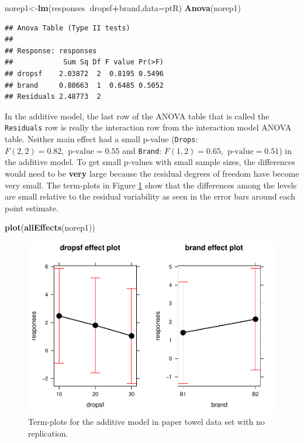 \documentclass[]{book}
\newenvironment{Shaded}{\begin{snugshade}}{\end{snugshade}}
\newcommand{\KeywordTok}[1]{\textcolor[rgb]{0.13,0.29,0.53}{\textbf{#1}}}
\newcommand{\DataTypeTok}[1]{\textcolor[rgb]{0.13,0.29,0.53}{#1}}
\newcommand{\OperatorTok}[1]{\textcolor[rgb]{0.81,0.36,0.00}{\textbf{#1}}}
\newcommand{\NormalTok}[1]{#1}
\theoremstyle{definition}
\theoremstyle{definition}
\theoremstyle{remark}
\begin{document}
\begin{Shaded}
\begin{Highlighting}[]
\NormalTok{norep1<-}\KeywordTok{lm}\NormalTok{(responses}\OperatorTok{~}\NormalTok{dropsf}\OperatorTok{+}\NormalTok{brand,}\DataTypeTok{data=}\NormalTok{ptR)}
\KeywordTok{Anova}\NormalTok{(norep1)}
\end{Highlighting}
\end{Shaded}

\begin{verbatim}
## Anova Table (Type II tests)
## 
## Response: responses
##            Sum Sq Df F value Pr(>F)
## dropsf    2.03872  2  0.8195 0.5496
## brand     0.80663  1  0.6485 0.5052
## Residuals 2.48773  2
\end{verbatim}

In the additive model, the last row of the ANOVA table that is called
the \texttt{Residuals} row is really the interaction row from the
interaction model ANOVA table. Neither main effect had a small p-value
(\texttt{Drops}: \(F(2,2)=0.82, \text{ p-value}=0.55\) and
\texttt{Brand}: \(F(1,2)=0.65, \text{ p-value}=0.51\)) in the additive
model. To get small p-values with small sample sizes, the differences
would need to be \textbf{very} large because the residual degrees of
freedom have become very small. The term-plots in Figure
\ref{fig:Figure4-18} show that the differences among the levels are
small relative to the residual variability as seen in the error bars
around each point estimate.




\begin{Shaded}
\begin{Highlighting}[]
\KeywordTok{plot}\NormalTok{(}\KeywordTok{allEffects}\NormalTok{(norep1))}
\end{Highlighting}
\end{Shaded}

\begin{figure}
\centering
\includegraphics{04-twoWayAnova_files/figure-latex/Figure4-18-1.pdf}
\caption{\label{fig:Figure4-18}Term-plots for the additive model in paper towel data set
with no replication.}
\end{figure}
\end{document}
